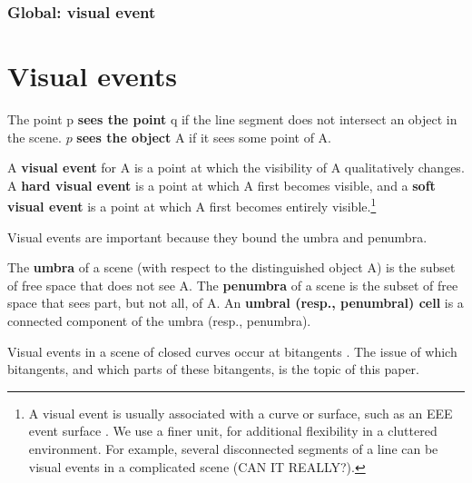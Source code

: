 \documentclass[12pt]{article}
\begin{document}
\subsubsection{Global: visual event}

\clearpage

\section{Visual events}
\label{sec:ve}

\begin{defn2}
The point p {\bf sees the point} q if the line segment  does not intersect an
object in the scene.
$p$ {\bf sees the object} A if it sees some point of A.
\end{defn2}

\begin{defn2}
A {\bf visual event} for A is a point at which the visibility of A 
qualitatively changes.
A {\bf hard visual event} is a point at which A first becomes visible,
and a {\bf soft visual event} is a point at which A first becomes 
entirely visible.\footnote{A visual event 
  is usually associated with a curve
  or surface, such as an EEE event surface \cite{teller92}.
  We use a finer unit, for additional flexibility in a cluttered environment.
  For example, several disconnected segments of a line 
  can be visual events in a complicated scene (CAN IT REALLY?).}
\end{defn2}

Visual events are important because they bound the umbra and penumbra.

\begin{defn2}
The {\bf umbra} of a scene (with respect to the distinguished object A)
is the subset of free space that does not see A.
The {\bf penumbra} of a scene is the subset of free space that sees part, 
but not all, of A.
An {\bf umbral (resp., penumbral) cell} is a connected component of the umbra 
(resp., penumbra).
\end{defn2}

Visual events in a scene of closed curves occur at bitangents \cite{durandthesis}.
%
%
The issue of which bitangents, and which parts of these bitangents, 
is the topic of this paper.
\end{document}
